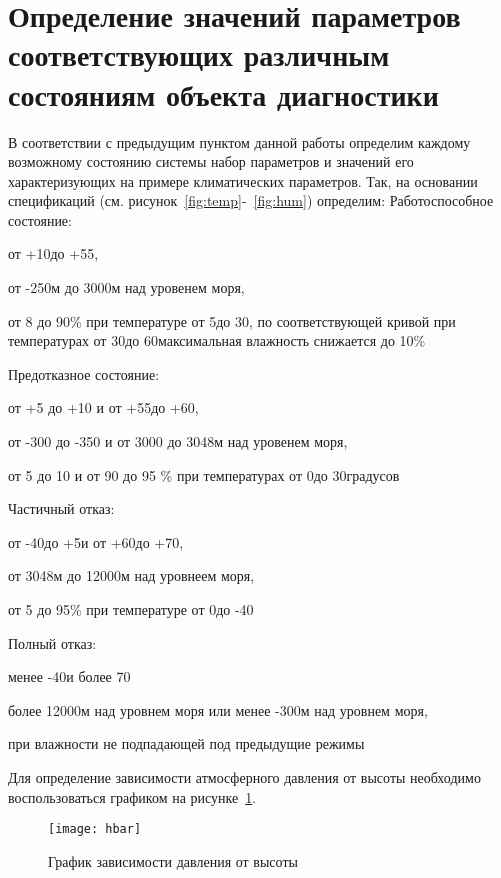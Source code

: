 \section{Определение значений параметров соответствующих различным состояниям объекта диагностики}
В соответствии с предыдущим пунктом данной работы определим каждому возможному состоянию системы набор параметров и значений его характеризующих на примере климатических параметров. Так, на основании спецификаций (см. рисунок~\ref{fig:temp}-~\ref{fig:hum}) определим:
Работоспособное состояние:
\begin{itemize*}
	\item{от +10 до +55,}
	\item{от -250м до 3000м над уровенем моря},
	\item{от 8 до 90\% при температуре от 5 до 30, по соответствующей кривой при температурах от 30 до 60 максимальная влажность снижается до 10\%}
\end{itemize*} 
Предотказное состояние: 
\begin{itemize*}
\item{от +5 до +10 и от +55 до +60,}
\item{от -300 до -350 и от 3000 до 3048м над уровенем моря,}
\item{от 5 до 10 и от 90 до 95 \% при температурах от 0 до 30 градусов}
\end{itemize*} 
Частичный отказ: 
\begin{itemize*}
\item{от -40 до +5 и от +60 до +70,}
\item{от 3048м до 12000м над уровнеем моря, }
\item{ от 5 до 95\% при температуре от 0 до -40}
\end{itemize*} 
Полный отказ: 
\begin{itemize*}
\item{менее -40 и более 70}
\item{более 12000м над уровнем моря или менее -300м над уровнем моря,}
\item{при влажности не подпадающей под предыдущие режимы}
\end{itemize*} 

Для определение зависимости атмосферного давления от высоты необходимо воспользоваться графиком на рисунке~\ref{fig:hbar}.

\begin{figure}[h]
	\centering
	\texttt{[image: hbar]}
	\caption{График зависимости давления от высоты}
	\label{fig:hbar}
\end{figure}


